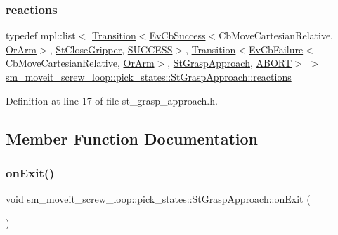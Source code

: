 \subsubsection{\texorpdfstring{reactions}{reactions}}
{\footnotesize\ttfamily typedef mpl\+::list$<$ \hyperlink{classsmacc_1_1Transition}{Transition}$<$\hyperlink{structsmacc_1_1EvCbSuccess}{Ev\+Cb\+Success}$<$Cb\+Move\+Cartesian\+Relative, \hyperlink{classsm__moveit__screw__loop_1_1OrArm}{Or\+Arm}$>$, \hyperlink{structsm__moveit__screw__loop_1_1pick__states_1_1StCloseGripper}{St\+Close\+Gripper}, \hyperlink{structsmacc_1_1default__transition__tags_1_1SUCCESS}{S\+U\+C\+C\+E\+SS}$>$, \hyperlink{classsmacc_1_1Transition}{Transition}$<$\hyperlink{structsmacc_1_1EvCbFailure}{Ev\+Cb\+Failure}$<$Cb\+Move\+Cartesian\+Relative, \hyperlink{classsm__moveit__screw__loop_1_1OrArm}{Or\+Arm}$>$, \hyperlink{structsm__moveit__screw__loop_1_1pick__states_1_1StGraspApproach}{St\+Grasp\+Approach}, \hyperlink{structsmacc_1_1default__transition__tags_1_1ABORT}{A\+B\+O\+RT}$>$ $>$ \hyperlink{structsm__moveit__screw__loop_1_1pick__states_1_1StGraspApproach_a5669f78f47cdc4f12af0b7a62d207b5a}{sm\+\_\+moveit\+\_\+screw\+\_\+loop\+::pick\+\_\+states\+::\+St\+Grasp\+Approach\+::reactions}}



Definition at line 17 of file st\+\_\+grasp\+\_\+approach.\+h.



\subsection{Member Function Documentation}
\mbox{\label{structsm__moveit__screw__loop_1_1pick__states_1_1StGraspApproach_a07ea9bf5677a5d1a4cbf0f9e109788a4}} 
\subsubsection{\texorpdfstring{on\+Exit()}{onExit()}}
{\footnotesize\ttfamily void sm\+\_\+moveit\+\_\+screw\+\_\+loop\+::pick\+\_\+states\+::\+St\+Grasp\+Approach\+::on\+Exit (\begin{DoxyParamCaption}\item[{\hyperlink{structsmacc_1_1default__transition__tags_1_1ABORT}{A\+B\+O\+RT}}]{ }\end{DoxyParamCaption})\hspace{0.3cm}{\ttfamily [inline]}}



